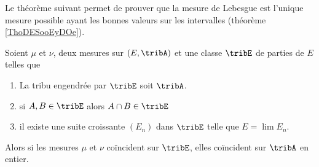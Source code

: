 Le théorème suivant permet de prouver que la mesure de Lebesgue est l'unique mesure possible ayant les bonnes valeurs sur les intervalles (théorème \ref{ThoDESooEyDOe}).
\begin{theorem} \label{ThoJDYlsXu}
    Soient \( \mu\) et \( \nu\), deux mesures sur \( (E,\tribA)\) et une classe \( \tribE\) de parties de \( E\) telles que
    \begin{enumerate}
        \item
            La tribu engendrée par \( \tribE\) soit \( \tribA\).
        \item
            si \( A,B\in\tribE\) alors \( A\cap B\in\tribE\)
        \item
            il existe une suite croissante \( (E_n)\) dans \( \tribE\) telle que \( E=\lim E_n\).
    \end{enumerate}
    Alors si les mesures \( \mu\) et \( \nu\) coïncident sur \( \tribE\), elles coïncident sur \( \tribA\) en entier.
\end{theorem}

